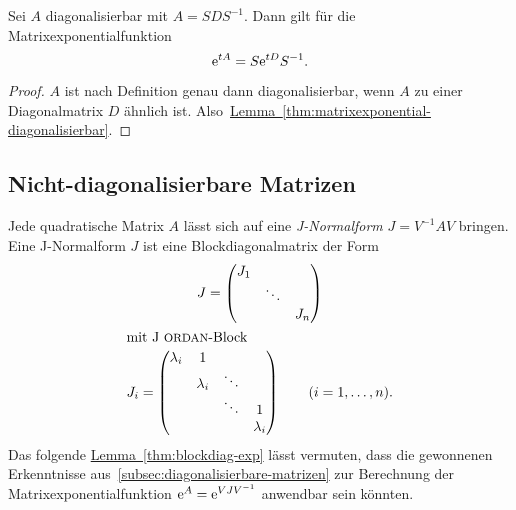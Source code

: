 \begin{corollary}
    Sei $A$ diagonalisierbar mit $A = S D S^{-1}$.
    Dann gilt für die Matrixexponentialfunktion
    \begin{equation*}
        \mathrm{e}^{t A} = S \mathrm{e}^{t D} S^{-1}.
    \end{equation*}
\end{corollary}

\begin{proof}
    $A$ ist nach Definition genau dann diagonalisierbar, wenn $A$ zu einer Diagonalmatrix $D$ ähnlich ist.
    Also~\hyperref[thm:matrixexponential-diagonalisierbar]{Lemma~\ref*{thm:matrixexponential-diagonalisierbar}}.
\end{proof}

\subsection{Nicht-diagonalisierbare Matrizen}\label{subsec:nichtdiagonalisierbare-matrizen}
Jede quadratische Matrix $A$ lässt sich auf eine \emph{J-Normalform} $J = V^{-1} A V$ bringen.
Eine J-Normalform $J$ ist eine Blockdiagonalmatrix der Form
\begin{gather*}
    J = \begin{pmatrix}
            J_1 &        &  \\
                & \ddots & \\
                &        & J_n
    \end{pmatrix}\\
    \intertext{mit J\textc{ordan}-Block}
    J_i = \begin{pmatrix}
              \lambda_i & 1         &        & \\
                        & \lambda_i & \ddots & \\
                        &           & \ddots & 1 \\
                        &           &        & \lambda_i
    \end{pmatrix}
    \qquad (i = 1,\dots,n).
\end{gather*}
Das folgende \hyperref[thm:blockdiag-exp]{Lemma~\ref*{thm:blockdiag-exp}} lässt vermuten,
dass die gewonnenen Erkenntnisse aus~\autoref{subsec:diagonalisierbare-matrizen} zur Berechnung der
Matrixexponentialfunktion $\mathrm{e}^{A} = \mathrm{e}^{V J V^{-1}}$ anwendbar sein könnten.

